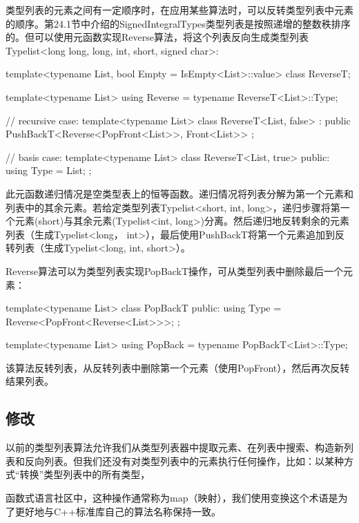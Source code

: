 类型列表的元素之间有一定顺序时，在应用某些算法时，可以反转类型列表中元素的顺序。第24.1节中介绍的SignedIntegralTypes类型列表是按照递增的整数秩排序的。但可以使用元函数实现Reverse算法，将这个列表反向生成类型列表Typelist<long long, long, int, short, signed char>:

\begin{cpp}
template<typename List, bool Empty = IsEmpty<List>::value>
class ReverseT;

template<typename List>
using Reverse = typename ReverseT<List>::Type;

// recursive case:
template<typename List>
class ReverseT<List, false>
: public PushBackT<Reverse<PopFront<List>>, Front<List>> { };

// basis case:
template<typename List>
class ReverseT<List, true>
{
	public:
	using Type = List;
};
\end{cpp}

此元函数递归情况是空类型表上的恒等函数。递归情况将列表分解为第一个元素和列表中的其余元素。若给定类型列表Typelist<short, int, long>，递归步骤将第一个元素(short)与其余元素(Typelist<int, long>)分离。然后递归地反转剩余的元素列表（生成Typelist<long， int>），最后使用PushBackT将第一个元素追加到反转列表（生成Typelist<long, int, short>）。

Reverse算法可以为类型列表实现PopBackT操作，可从类型列表中删除最后一个元素：

\begin{cpp}
template<typename List>
class PopBackT {
	public:
	using Type = Reverse<PopFront<Reverse<List>>>;
};

template<typename List>
using PopBack = typename PopBackT<List>::Type;
\end{cpp}

该算法反转列表，从反转列表中删除第一个元素（使用PopFront），然后再次反转结果列表。

\subsection{修改}

以前的类型列表算法允许我们从类型列表器中提取元素、在列表中搜索、构造新列表和反向列表。但我们还没有对类型列表中的元素执行任何操作，比如：以某种方式“转换”类型列表中的所有类型，

\begin{notice}
函数式语言社区中，这种操作通常称为map（映射），我们使用变换这个术语是为了更好地与C++标准库自己的算法名称保持一致。
\end{notice}

